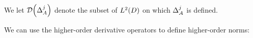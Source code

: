 We let $\Domain{\DeltaA^j}$ denote the subset of $\LtD$ on which $\Delta_{A}^j$ is defined.



We can use the higher-order derivative operators to define higher-order norms:






